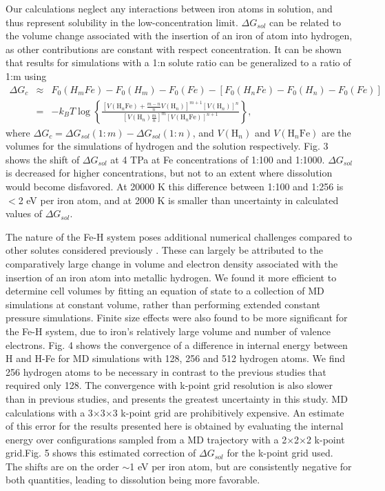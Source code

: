 Our calculations neglect any interactions between iron atoms in solution, and
thus represent solubility in the low-concentration limit.
$\Delta G_{sol}$ can be related to the volume change associated with
the insertion of an iron of atom into hydrogen, as other contributions are
constant with respect concentration. It can be shown that results for
simulations with a 1:n solute ratio can be generalized to a ratio of 1:m using
  \begin{eqnarray}
  \Delta G_c &\approx& F_0(H_mFe)-F_0(H_m)-F_0(Fe)- \left[
    F_0(H_nFe)-F_0(H_n)-F_0(Fe)\right] \\
    &=& -k_BT\log\left\{ 
    \frac{\left[V(\mathrm{H}_n\mathrm{Fe}) +
    \frac{m-n}{n}V(\mathrm{H}_n)\right]^{m+1}
    \left[V(\mathrm{H}_n)\right]^{n}}
    {\left[V(\mathrm{H}_n)\frac{m}{n}\right]^m
    \left[V(\mathrm{H}_n\mathrm{Fe})\right]^{n + 1}}
   \right\},
\end{eqnarray}
where $\Delta G_c = \Delta G_{sol}(1:m)- \Delta G_{sol}(1:n)$, and
$V(\mathrm{H}_n)$ and $V(\mathrm{H}_n\mathrm{Fe})$ are the volumes for the
simulations of hydrogen and the solution respectively. 
Fig. 3 shows the shift of
$\Delta G_{sol}$ at 4 TPa at Fe concentrations of 1:100 and 1:1000. $\Delta
G_{sol}$ is decreased for higher concentrations, but not to an extent where
dissolution would become disfavored. At 20000 K
this difference between 1:100 and 1:256 is  $<$2 eV per iron atom, and
at 2000 K is smaller than uncertainty in calculated values of $\Delta
G_{sol}$.


The nature of the Fe-H system poses additional numerical challenges compared to other solutes
considered previously \citep{wilson10,wilson12a,wilson12b,gonzalez13}.
These can largely be attributed to the comparatively large change in volume
and electron density associated with the insertion of an iron atom into
metallic hydrogen. We found it
more efficient to determine cell volumes by fitting an equation of state to a
collection of MD simulations at constant volume, rather than performing
extended constant pressure simulations. 
Finite size effects were also found to be more significant for the Fe-H
system, due to iron's relatively large volume and number of valence electrons. Fig.
4 shows the convergence of a difference in internal energy between H and H-Fe
for MD simulations with 128, 256 and 512 hydrogen atoms. We find 256 hydrogen
atoms to be necessary in contrast to the previous studies that required only 128.
The convergence with k-point grid resolution is also slower
than in previous studies, and presents the greatest uncertainty in this study.
MD calculations with a 3$\times$3$\times$3 k-point grid are prohibitively expensive. An
estimate of this error for the results presented here is obtained by
evaluating the internal energy over configurations sampled from a MD
trajectory with a 2$\times$2$\times$2 k-point grid.\linebreak Fig. 5 shows this
estimated correction of $\Delta G_{sol}$ for the k-point grid used. 
The shifts are on the order $\sim$1 eV per iron atom, but are
consistently negative for both quantities, leading to dissolution being more favorable. 

